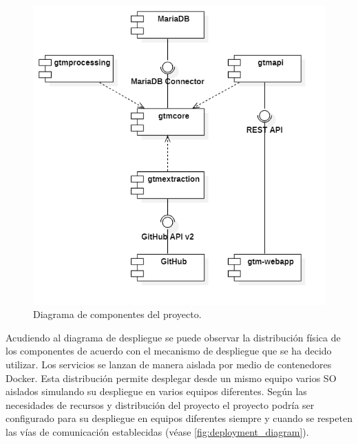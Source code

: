 \begin{figure}[!ht]
	\centering
\includegraphics[width=\textwidth]{img/component_diagram.png}
	\caption{Diagrama de componentes del proyecto.}
	\label{fig:component_diagram}
\end{figure}

Acudiendo al diagrama de despliegue se puede observar la distribución física de los componentes de acuerdo con el mecanismo de despliegue que se ha decido utilizar. Los servicios se lanzan de manera aislada por medio de contenedores Docker. Esta distribución permite desplegar desde un mismo equipo varios SO aislados simulando su despliegue en varios equipos diferentes. Según las necesidades de recursos y distribución del proyecto el proyecto podría ser configurado para su despliegue en equipos diferentes siempre y cuando se respeten las vías de comunicación establecidas (véase \autoref{fig:deployment_diagram}).

